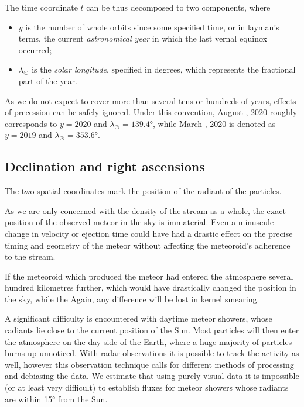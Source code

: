         The time coordinate $t$ can be thus decomposed to two components,
        where
        \begin{itemize}
            \item $y$ is the number of whole orbits since some specified time, or in layman's terms, the current \emph{astronomical year} in which
                the last vernal equinox occurred;
            \item $\lambda_\Sun$ is the \emph{solar longitude}, specified in degrees, which represents the fractional part of the year.
        \end{itemize}

        As we do not expect to cover more than several tens or hundreds of years, effects of precession can be safely ignored.
        Under this convention, August , 2020 roughly corresponds to $y = 2020$ and $\lambda_\Sun = \ang{139.4}$,
        while March , 2020 is denoted as $y = 2019$ and $\lambda_\Sun = \ang{353.6}$.

    \subsection{Declination and right ascensions} \label{ios}
        The two spatial coordinates mark the position of the radiant of the particles.

        As we are only concerned with the density of the stream as a whole,
        the exact position of the observed meteor in the sky is immaterial.
        Even a minuscule change in velocity or ejection time could have had a drastic effect
        on the precise timing and geometry of the meteor without affecting the meteoroid's
        adherence to the stream.

        If the meteoroid which produced the meteor
        had entered the atmosphere several hundred kilometres further,
        which would have drastically changed the position in the sky, while the
        Again, any difference will be lost in kernel smearing.

        A significant difficulty is encountered with daytime meteor showers, whose radiants
        lie close to the current position of the Sun.
        Most particles will then enter the atmosphere on the day side
        of the Earth, where a huge majority of particles burns up unnoticed.
        With radar observations it is possible to track the activity as well,
        however this observation technique calls for different methods of processing and debiasing the data.
        We estimate that using purely visual data it is impossible (or at least very difficult) to establish fluxes
        for meteor showers whose radiants are within \ang{15} from the Sun.



